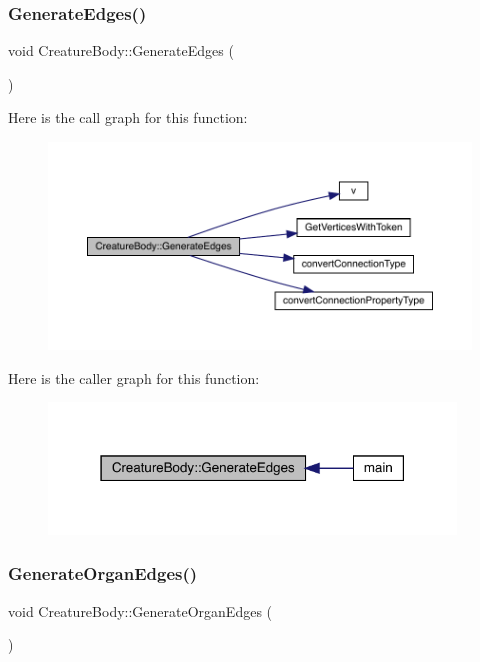 \subsubsection{\texorpdfstring{Generate\+Edges()}{GenerateEdges()}}
{\footnotesize\ttfamily void Creature\+Body\+::\+Generate\+Edges (\begin{DoxyParamCaption}{ }\end{DoxyParamCaption})}

Here is the call graph for this function\+:
\nopagebreak
\begin{figure}[H]
\begin{center}
\leavevmode
\includegraphics[width=350pt]{class_creature_body_a8feda2cfc35e1b76730a31eb368ffed6_cgraph}
\end{center}
\end{figure}
Here is the caller graph for this function\+:
\nopagebreak
\begin{figure}[H]
\begin{center}
\leavevmode
\includegraphics[width=307pt]{class_creature_body_a8feda2cfc35e1b76730a31eb368ffed6_icgraph}
\end{center}
\end{figure}
\mbox{\label{class_creature_body_af1303a40606bf06aed980f14e7027d54}} 
\subsubsection{\texorpdfstring{Generate\+Organ\+Edges()}{GenerateOrganEdges()}}
{\footnotesize\ttfamily void Creature\+Body\+::\+Generate\+Organ\+Edges (\begin{DoxyParamCaption}{ }\end{DoxyParamCaption})}

